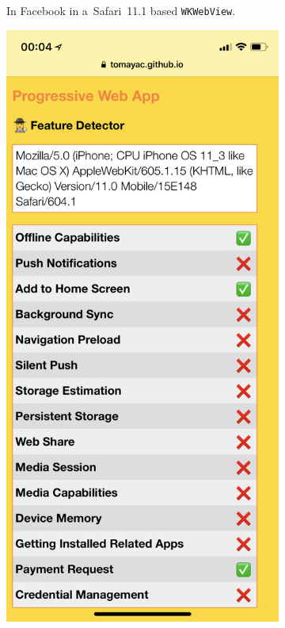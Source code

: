 \documentclass[sigconf]{acmart}
\begin{document}
\begin{figure}[h]
\begin{subfigure}[t]{0.475\columnwidth}
    \caption[\textsc{pwa} Feature Detector running in Facebook.]{
      In Facebook in a~Safari~11.1 based \texttt{WKWebView}.}
    \label{fig:facebook-ios-safari11_1}
  \end{subfigure}    
  \quad
  \begin{subfigure}[t]{0.475\columnwidth}  
    \includegraphics[width=1\columnwidth,frame]{pwa-feature-detector-twitter-ios-safari11_1}

\end{subfigure}
\end{figure}
\end{document}
